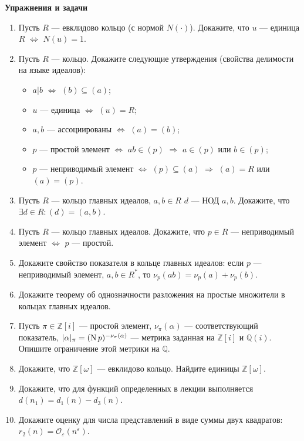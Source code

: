 \noindent\textbf{Упражнения и задачи}
\begin{enumerate}[topsep=0pt]

    \item Пусть $R$ --- евклидово кольцо (с нормой $N(\cdot)$). Докажите, что $u$ --- единица $R$ $\iff$ $N(u)=1$.
    
    \item Пусть $R$ --- кольцо. Докажите следующие утверждения (свойства делимости на языке идеалов):
    \begin{itemize}[noitemsep,topsep=0pt]
        \item $a|b$ $\Leftrightarrow$ $(b) \subseteq (a)$;
        \item $u$ --- единица $\Leftrightarrow$ $(u)=R$;
        \item $a,b$ --- ассоциированы $\Leftrightarrow$ $(a)=(b)$;
        \item $p$ --- простой элемент $\Leftrightarrow$ $ab \in (p)$ $\Rightarrow$ $a \in (p)$ или $b \in (p)$;
        \item $p$ --- неприводимый элемент $\Leftrightarrow$ $(p) \subseteq (a)$ $\Rightarrow$ $(a) = R$ или $(a) = (p)$.
    \end{itemize}

    \item Пусть $R$ --- кольцо главных идеалов, $a,b \in R$ $d$ --- НОД $a,b$. Докажите, что $\exists d \in R: (d)=(a,b)$. 
    
    \item Пусть $R$ --- кольцо главных идеалов. Докажите, что $p\in R$ --- неприводимый элемент $\iff$ $p$ --- простой.
    
    \item Докажите свойство показателя в кольце главных идеалов: если $p$ --- неприводимый элемент, $a,b \in R^*$, то $\nu_p(ab) = \nu_p(a)+\nu_p(b)$.
    
    \item Докажите теорему об однозначности разложения на простые множители в кольцах главных идеалов.
    
    \item Пусть $\pi\in\mathbb{Z}[i]$ --- простой элемент, $\nu_\pi(\alpha)$ --- соответствующий показатель, $|\alpha|_\pi = (\operatorname{N} p)^{-\nu_\pi(\alpha)}$ --- метрика заданная на $\mathbb{Z}[i]$ и $\mathbb{Q}(i)$. Опишите ограничение этой метрики на $\mathbb{Q}$. %
    
    \item Докажите, что $\mathbb{Z}[\omega]$ --- евклидово кольцо. Найдите единицы $\mathbb{Z}[\omega]$. %
    
    \item Докажите, что для функций определенных в лекции выполняется $d(n_1)=d_1(n)-d_3(n)$. %
    
    \item Докажите оценку для числа представлений в виде суммы двух квадратов: $r_2(n) = \mathcal{O}_\varepsilon (n^\varepsilon)$. %
  
\end{enumerate}

